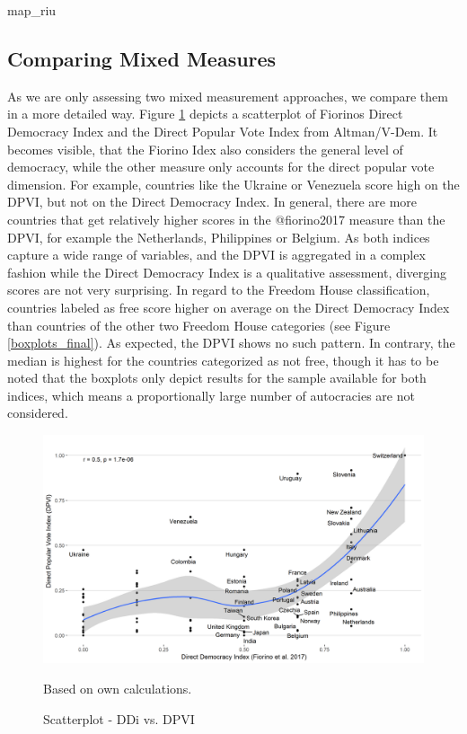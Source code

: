 \documentclass[]{article}
\begin{document}
map\_riu

\subsection{Comparing Mixed Measures} \label{mixed_empiric}

As we are only assessing two mixed measurement approaches, we compare
them in a more detailed way. Figure \ref{mixed} depicts a scatterplot of
Fiorinos Direct Democracy Index and the Direct Popular Vote Index from
Altman/V-Dem. It becomes visible, that the Fiorino Idex also considers
the general level of democracy, while the other measure only accounts
for the direct popular vote dimension. For example, countries like the
Ukraine or Venezuela score high on the DPVI, but not on the Direct
Democracy Index. In general, there are more countries that get
relatively higher scores in the @fiorino2017 measure than the DPVI, for
example the Netherlands, Philippines or Belgium. As both indices capture
a wide range of variables, and the DPVI is aggregated in a complex
fashion while the Direct Democracy Index is a qualitative assessment,
diverging scores are not very surprising. In regard to the Freedom House
classification, countries labeled as free score higher on average on the
Direct Democracy Index than countries of the other two Freedom House
categories (see Figure \ref{boxplots_final}). As expected, the DPVI
shows no such pattern. In contrary, the median is highest for the
countries categorized as not free, though it has to be noted that the
boxplots only depict results for the sample available for both indices,
which means a proportionally large number of autocracies are not
considered.

\begin{figure}[!th]
    \caption{Scatterplot - DDi vs. DPVI}
    \label{mixed}
    \includegraphics[width=\textwidth]{images/mixed.png}
    \flushright
    {\scriptsize Based on own calculations. \par}
\end{figure}
\end{document}
